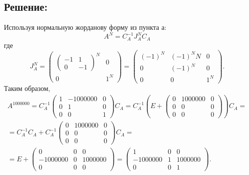 \documentclass[12pt]{article}
\begin{document}
    \subsection*{Решение:}
    Используя нормальную жорданову форму из пункта а:
    \[
        A^N
        = C_A^{-1} J_A^N C_A
    \]
    где
    \[
        J_A^N
        = \begin{pmatrix}
              \begin{pmatrix}
                  -1 & 1  \\
                  0  & -1
              \end{pmatrix}^N & 0 \\
              0 & 1^N
        \end{pmatrix}
        = \begin{pmatrix}
        (-1)
              ^N & (-1)^N N & 0   \\
              0  & (-1)^N   & 0   \\
              0  & 0        & 1^N
        \end{pmatrix} .
    \]
    Таким образом,
    \begin{multline*}
        A^{1000000}
        = C_A^{-1}
        \begin{pmatrix}
            1 & -1000000 & 0 \\
            0 & 1        & 0 \\
            0 & 0        & 1
        \end{pmatrix}
        C_A
        = C_A^{-1}
        \left (
        E
        + \begin{pmatrix}
              0 & 1000000 & 0 \\
              0 & 0       & 0 \\
              0 & 0       & 0
        \end{pmatrix}
        \right )
        C_A
        = \\
        = C_A^{-1} C_A
        + C_A^{-1} \begin{pmatrix}
                       0 & 1000000 & 0 \\
                       0 & 0       & 0 \\
                       0 & 0       & 0
        \end{pmatrix}
        C_A
        = \\
        = E
        + \begin{pmatrix}
              0        & 0 & 0       \\
              -1000000 & 0 & 1000000 \\
              0        & 0 & 0
        \end{pmatrix}
        = \begin{pmatrix}
              1        & 0 & 0       \\
              -1000000 & 1 & 1000000 \\
              0        & 0 & 1
        \end{pmatrix}.
    \end{multline*}
\end{document}
